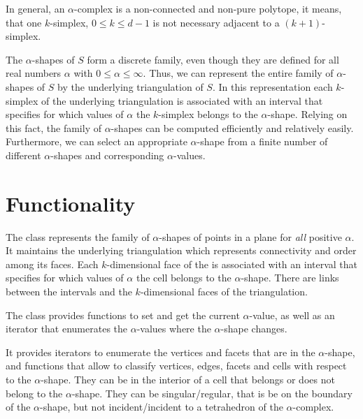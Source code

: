 In general, an $\alpha$-complex is a non-connected and non-pure polytope, it
means, that one $k$-simplex, $0 \leq k \leq d-1$ is not necessary adjacent to
a $(k+1)$-simplex.

The $\alpha$-shapes of $S$ form a discrete family, even though they
are defined for all real numbers $\alpha$ with $0 \leq \alpha
\leq \infty$. Thus, we can represent the entire family of $\alpha$-shapes
of $S$ by the underlying triangulation of $S$. In this representation
each $k$-simplex of the underlying triangulation is associated with an
interval that specifies for which values of $\alpha$ the $k$-simplex
belongs to the $\alpha$-shape. Relying on this fact, the family of
$\alpha$-shapes can be computed efficiently and relatively
easily. Furthermore, we can select an appropriate $\alpha$-shape from a
finite number of different $\alpha$-shapes and corresponding
$\alpha$-values.




\section{Functionality \label{I1_SectAlpha_Shape_3}}

The class  represents the family of
$\alpha$-shapes of points in a plane for {\em all} positive
$\alpha$. It maintains the underlying triangulation  which
represents connectivity and order among its faces. Each
$k$-dimensional face of the  is associated with an interval
that specifies for which values of $\alpha$ the cell belongs to the
$\alpha$-shape. There are links between the intervals and the
$k$-dimensional faces of the triangulation.


The class  provides functions to set and
get the current $\alpha$-value, as well as an iterator that enumerates
the $\alpha$-values where the $\alpha$-shape changes.


It provides iterators to enumerate the vertices and facets that are in
the $\alpha$-shape, and functions that allow to classify vertices,
edges, facets and cells with respect to the $\alpha$-shape. They can be in
the interior of a cell that belongs or does not belong to the $\alpha$-shape.
They can be singular/regular, that is be on the boundary of the $\alpha$-shape,
but not incident/incident to a tetrahedron of the $\alpha$-complex.

